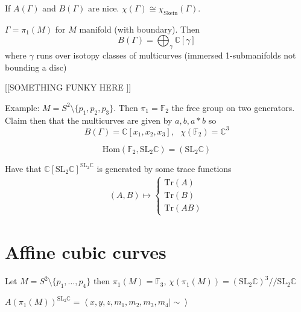 \begin{corollary}
    If $A(\Gamma) $ and $B(\Gamma)$ are nice. 
    $\chi (\Gamma) \cong \chi_{\mathrm{Skein}}(\Gamma) $. 
\end{corollary}

\begin{theorem}
    $\Gamma = \pi_1 ( M) $ for $ M $ manifold (with boundary). 
    Then 
    \begin{equation}
        B(\Gamma)  = \bigoplus_ \gamma \mathbb{C} [\gamma] 
    \end{equation}
    where $\gamma$ runs over isotopy classes of multicurves (immersed 1-submanifolds not bounding a disc) 
\end{theorem}
[[SOMETHING FUNKY HERE ]] 

Example:
$M = S^2 \setminus \{ p_1, p_2, p_3 \} $. 
Then $ \pi_1 = \mathbb{F} _2 $ the free group on two generators. 
Claim then that the multicurves are given by $a, b , a*b $ so 
\begin{equation}
    B(\Gamma) = \mathbb{C} [x_1, x_2, x_3] , ~~~ \chi( \mathbb{F} _2) = \mathbb{C} ^3 
\end{equation}

\begin{equation}
    \mathrm{Hom}(\mathbb{F} _2 , \mathrm{SL}_2 \mathbb{C} ) = ( \mathrm{SL}_2 \mathbb{C} ) 
\end{equation}

Have that $ \mathbb{C} [ \mathrm{SL}_2 \mathbb{C} ] ^{\mathrm{SL}_2 \mathbb{C} } $ 
is generated by some trace functions 
\begin{align}
    (A,B) \mapsto \begin{cases}
        \mathrm{Tr} ( A)  \\
        \mathrm{Tr} ( B) \\
        \mathrm{Tr} ( AB) 
    \end{cases}
\end{align}


\section{Affine cubic curves} %

Let $ M = S^2 \setminus \{p_1, \dots, p_4 \} $ 
then $ \pi_1 (M) = \mathbb{F} _3 $, $ \chi(\pi_1 ( M) ) = ( \mathrm{SL}_2 \mathbb{C} ) ^3 // \mathrm{SL}_2 \mathbb{C} $

$ A(\pi_1 ( M) ) ^{\mathrm{SL}_2 \mathbb{C} }  = \left<x,y,z, m_1, m_2, m_3, m_4 | \sim \right>$ 

